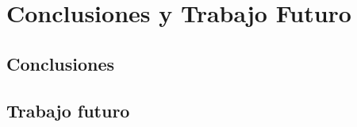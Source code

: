 \chapter{Conclusiones y Trabajo Futuro} \label{Capítulo 6}



\section{Conclusiones} \label{Subsec: 6_1}



\section{Trabajo futuro} \label{Subsec: 6_2}